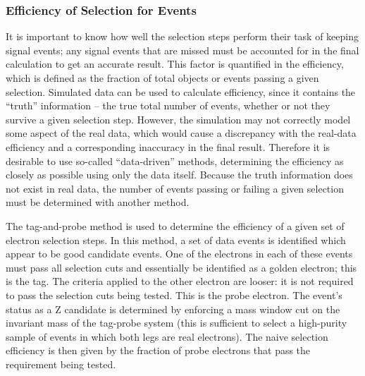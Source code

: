 

\subsubsection{Efficiency of Selection for \Zee Events}
\label{evSel:eff}

It is important to know how well the selection steps perform their task of 
keeping signal events;  
any signal events that are 
missed %
must be accounted for in the final 
calculation to get an accurate result.  
This factor is quantified in the efficiency, which is defined as 
the fraction of total objects or events passing a given selection. %
Simulated data can be used to calculate efficiency, 
since it contains the ``truth'' information -- 
the true total number of events, 
whether or not they survive a given selection step.
However, the simulation may not correctly model some 
aspect of the real data, which would cause a discrepancy 
with the real-data efficiency 
and a corresponding inaccuracy in the final result.  
Therefore it is desirable to use so-called ``data-driven''  %
methods, %
determining the efficiency as closely as possible 
using only the data itself.  
Because the truth information does not exist in real data, 
the number of events passing or failing a given selection 
must be determined with another method.  

The tag-and-probe method is used to determine the efficiency of a given set of electron selection steps.  
In this method, a set of data events is identified which appear to be good 
\Zee
candidate events.  
One of the electrons in each of these events must pass 
all selection cuts and essentially be identified as a golden electron; 
this is the tag.  
The criteria applied to the other electron are looser: 
it is not required to pass the selection cuts being tested.  
This is the probe electron.  
The event's status as a Z candidate is determined by enforcing 
a mass window cut on the invariant mass of the tag-probe system 
(this is sufficient %
to select a high-purity sample of 
events in which both legs are real electrons).
The naive selection efficiency is then given by the fraction 
of probe electrons that pass the requirement being tested.  

